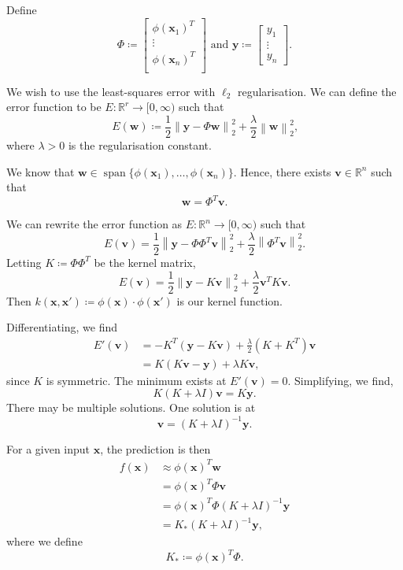 \documentclass[11pt,twoside]{report}
\newcommand\bv{\mathbf{v}}
\newcommand\bw{\mathbf{w}}
\newcommand\bx{\mathbf{x}}
\newcommand\by{\mathbf{y}}
\newcommand\bbR{\mathbb{R}}
\newcommand\norm[1]{\left\|#1\right\|}
\DeclareMathOperator{\spn}{span}
\begin{document}
Define \[
    \Phi \coloneqq \begin{bmatrix}
        \phi(\bx_1)^T \\
        \vdots \\
        \phi(\bx_n)^T \\
    \end{bmatrix} \text{ and }\by \coloneqq \begin{bmatrix}
        y_1 \\
        \vdots \\
        y_n
    \end{bmatrix} \text{.}
\]

We wish to use the least-squares error with $\ell_2$ regularisation. We can define the error function to be $E : \bbR^r \to [0, \infty)$ such that \[
    E(\bw) \coloneqq \frac{1}{2}\norm{\by - \Phi\bw}_2^2 + \frac{\lambda}{2} \norm{\bw}_2^2 \text{,}
\] where $\lambda > 0$ is the regularisation constant.

We know that $\bw \in \spn\{\phi(\bx_1), \dots, \phi(\bx_n)\}$. Hence, there exists $\bv \in \bbR^n$ such that \[
    \bw = \Phi^T\bv \text{.}
\]

We can rewrite the error function as $E : \bbR^n \to [0, \infty)$ such that \[
    E(\bv) = \frac{1}{2}\norm{\by - \Phi\Phi^T\bv}_2^2 + \frac{\lambda}{2} \norm{\Phi^T\bv}_2^2 \text{.}
\] Letting $K \coloneqq \Phi\Phi^T$ be the kernel matrix,\[
    E(\bv) = \frac{1}{2}\norm{\by - K\bv}_2^2 + \frac{\lambda}{2} \bv^T K \bv \text{.}
\] Then $k(\bx, \bx') \coloneqq \phi(\bx) \cdot \phi(\bx')$ is our kernel function.

Differentiating, we find \begin{align*}
    E'(\bv) &= -K^T(\by - K\bv) + \frac{\lambda}{2} (K + K^T)\bv \\
    &= K(K\bv - \by) + \lambda K\bv \text{,}
\end{align*} since $K$ is symmetric. The minimum exists at $E'(\bv) = 0$. Simplifying, we find,\[
    K(K + \lambda I)\bv = K\by \text{.}
\] There may be multiple solutions. One solution is at \[
    \bv = (K + \lambda I)^{-1}\by \text{.}
\]

For a given input $\bx$, the prediction is then \begin{align*}
    f(\bx) &\approx \phi(\bx)^T \bw \\
    &= \phi(\bx)^T \Phi \bv \\
    &= \phi(\bx)^T \Phi (K + \lambda I)^{-1}\by \\
    &= K_* (K + \lambda I)^{-1}\by \text{,}
\end{align*} where we define \[
    K_* \coloneqq \phi(\bx)^T \Phi \text{.}
\]
\end{document}
